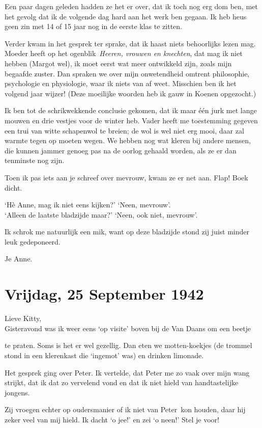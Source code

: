 \documentclass{book}
\begin{document}
Een paar dagen geleden hadden ze het er over, dat ik toch nog erg dom
ben, met het gevolg dat ik de volgende dag hard aan het werk ben gegaan.
Ik heb heus geen zin met 14 of 15 jaar nog in de eerste klas te zitten.

Verder kwam in het gesprek ter sprake, dat ik haast niets behoorlijks
lezen mag. Moeder heeft op het ogenblik~\emph{Heeren, vrouwen en
knechten}, dat mag ik niet hebben (Margot wel), ik moet eerst wat meer
ontwikkeld zijn, zoals mijn begaafde zuster. Dan spraken we over mijn
onwetendheid omtrent philosophie, psychologie en physiologie, waar ik
niets van af weet. Misschien ben ik het volgend jaar wijzer! (Deze
moeilijke woorden heb ik gauw in Koenen opgezocht.)

Ik ben tot de schrikwekkende conclusie gekomen, dat ik maar één jurk met
lange mouwen en drie vestjes voor de winter heb. Vader heeft me
toestemming gegeven een trui van witte schapenwol te breien; de wol is
wel niet erg mooi, daar zal warmte tegen op moeten wegen. We hebben nog
wat kleren bij andere mensen, die kunnen jammer genoeg pas na de oorlog
gehaald worden, als ze er dan tenminste nog zijn.

Toen ik pas iets aan je schreef over mevrouw, kwam ze er net aan. Flap!
Boek dicht.

`Hè Anne, mag ik niet eens kijken?' `Neen, mevrouw'.\\`Alleen de laatste
bladzijde maar?' `Neen, ook niet, mevrouw'.

Ik schrok me natuurlijk een mik, want op deze bladzijde stond zij juist
minder leuk gedeponeerd.

Je Anne.

\chapter{Vrijdag, 25 September 1942}

Lieve Kitty,\\Gisteravond was ik weer eens `op visite' boven bij de Van
Daans om een beetje

te praten. Soms is het er wel gezellig. Dan eten we motten-koekjes (de
trommel stond in een klerenkast die `ingemot' was) en drinken limonade.

Het gesprek ging over Peter. Ik vertelde, dat Peter me zo vaak over mijn
wang strijkt, dat ik dat zo vervelend vond en dat ik niet hield van
handtastelijke jongens.

Zij vroegen echter op oudersmanier of ik niet van Peter~kon houden, daar
hij zeker veel van mij hield. Ik dacht `o jee!' en zei `o neen!' Stel je
voor!
\end{document}
